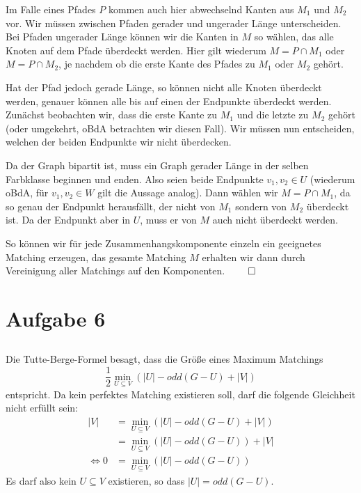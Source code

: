 \documentclass[a4paper]{article}
\begin{document}
Im Falle eines Pfades $P$ kommen auch hier abwechselnd Kanten aus $M_1$ und
$M_2$ vor. Wir müssen zwischen Pfaden gerader und ungerader Länge unterscheiden.
Bei Pfaden ungerader Länge können wir die Kanten in $M$ so wählen, das alle
Knoten auf dem Pfade überdeckt werden. Hier gilt wiederum $M = P \cap M_1$
oder $M = P \cap M_2$, je nachdem ob die erste Kante des Pfades zu $M_1$
oder $M_2$ gehört.

Hat der Pfad jedoch gerade Länge, so können nicht alle Knoten überdeckt
werden, genauer können alle bis auf einen der Endpunkte überdeckt werden.
Zunächst beobachten wir, dass die erste Kante zu $M_1$ und die
letzte zu $M_2$ gehört (oder umgekehrt, oBdA betrachten wir diesen Fall).
Wir müssen nun entscheiden, welchen der beiden Endpunkte wir nicht
überdecken.

Da der Graph bipartit ist, muss ein Graph gerader Länge in der selben
Farbklasse beginnen und enden. Also seien beide Endpunkte $v_1, v_2 \in U$
(wiederum oBdA, für $v_1, v_2 \in W$ gilt die Aussage analog).
Dann wählen wir $M = P \cap M_1$, da so genau der Endpunkt herausfällt, der
nicht von $M_1$ sondern von $M_2$ überdeckt ist. Da der Endpunkt aber in
$U$, muss er von $M$ auch nicht überdeckt werden.

So können wir für jede Zusammenhangskomponente einzeln ein geeignetes
Matching erzeugen, das gesamte Matching $M$ erhalten wir dann durch
Vereinigung aller Matchings auf den Komponenten. $\qed$

\section{Aufgabe 6}
\subsection{}
Die Tutte-Berge-Formel besagt, dass die Größe eines Maximum Matchings
\[
	\frac{1}{2} \min_{U \subseteq V} ( |U| - odd(G - U) + |V|)
\]
entspricht. Da kein perfektes Matching existieren soll, darf die folgende
Gleichheit nicht erfüllt sein:
\begin{align*}
|V| &= \min_{U \subseteq V} ( |U| - odd(G - U) + |V|) \\
	&= \min_{U \subseteq V} ( |U| - odd(G - U) ) + |V| \\
\Leftrightarrow 0 &= \min_{U \subseteq V} ( |U| - odd(G - U) )
\end{align*}
Es darf also kein $U \subseteq V$ existieren, so dass $|U| = odd(G - U)$.
\end{document}
